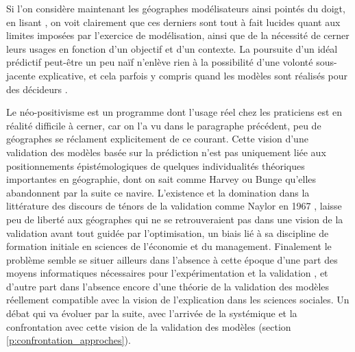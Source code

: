 Si l'on considère maintenant les géographes modélisateurs ainsi pointés du doigt, en lisant \autocites{Chorley1967, Harvey1969, Haggett1965}, on voit clairement que ces derniers sont tout à fait lucides quant aux limites imposées par l'exercice de modélisation, ainsi que de la nécessité de cerner leurs usages en fonction d'un objectif et d'un contexte. La poursuite d'un idéal prédictif peut-être un peu naïf n'enlève rien à la possibilité d'une volonté sous-jacente explicative, et cela parfois y compris quand les modèles sont réalisés pour des décideurs .


Le néo-positivisme est un programme dont l'usage réel chez les praticiens est en réalité difficile à cerner, car on l'a vu dans le paragraphe précédent, peu de géographes se réclament explicitement de ce courant. Cette vision d'une validation des modèles basée sur la prédiction n'est pas uniquement liée aux positionnements épistémologiques de quelques individualités théoriques importantes en géographie, dont on sait comme Harvey ou Bunge qu'elles abandonnent par la suite ce navire.  L'existence et la domination dans la littérature des discours de ténors de la validation comme Naylor en 1967 \autocite{Naylor1967}, laisse peu de liberté aux géographes qui ne se retrouveraient pas dans une vision de la validation avant tout guidée par l'optimisation, un biais lié à sa discipline de formation initiale en sciences de l'économie et du management. Finalement le problème semble se situer ailleurs dans l'absence à cette époque d'une part des moyens informatiques nécessaires pour l'expérimentation et la validation \autocite{Haggett1969, Marble1972}, et d'autre part dans l'absence encore d'une théorie de la validation des modèles réellement compatible avec la vision de l'explication dans les sciences sociales. Un débat qui va évoluer par la suite, avec l'arrivée de la systémique et la confrontation avec cette vision de la validation des modèles (section \ref{p:confrontation_approches}).

